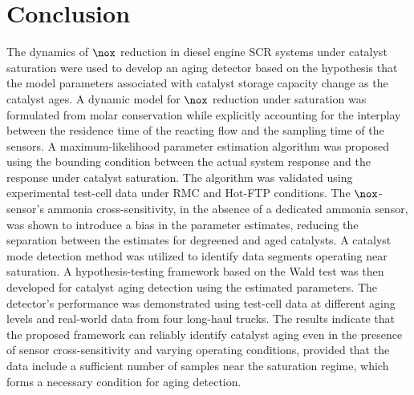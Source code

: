 \section{Conclusion}
The dynamics of $\nox$ reduction in diesel engine SCR systems under catalyst saturation were used to develop an aging
detector based on the hypothesis that the model parameters associated with catalyst storage capacity change as the
catalyst ages. A dynamic model for $\nox$ reduction under saturation was formulated from molar conservation while
explicitly accounting for the interplay between the residence time of the reacting flow and the sampling time of the
sensors. A maximum-likelihood parameter estimation algorithm was proposed using the bounding condition between the
actual system response and the response under catalyst saturation. The algorithm was validated using experimental
test-cell data under RMC and Hot-FTP conditions. The $\nox$-sensor's ammonia cross-sensitivity, in the absence of a
dedicated ammonia sensor, was shown to introduce a bias in the parameter estimates, reducing the separation between the
estimates for degreened and aged catalysts. A catalyst mode detection method was utilized to identify data segments
operating near saturation. A hypothesis-testing framework based on the Wald test was then developed for catalyst aging
detection using the estimated parameters. The detector's performance was demonstrated using test-cell data at different
aging levels and real-world data from four long-haul trucks. The results indicate that the proposed framework can
reliably identify catalyst aging even in the presence of sensor cross-sensitivity and varying operating conditions,
provided that the data include a sufficient number of samples near the saturation regime, which forms a necessary
condition for aging detection.
